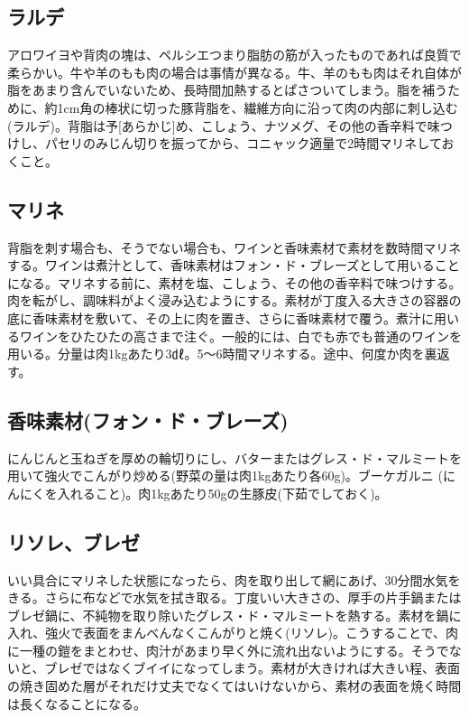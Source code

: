 \hypertarget{ux30e9ux30ebux30c7}{%
\subsection{ラルデ}\label{ux30e9ux30ebux30c7}}

アロワイヨや背肉の塊は、ペルシエつまり脂肪の筋が入ったものであれば良質で柔らかい。牛や羊のもも肉の場合は事情が異なる。牛、羊のもも肉はそれ自体が脂をあまり含んでいないため、長時間加熱するとぱさついてしまう。脂を補うために、約1cm角の棒状に切った豚背脂を、繊維方向に沿って肉の内部に刺し込む(ラルデ)。背脂は予{[}あらかじ{]}め、こしょう、ナツメグ、その他の香辛料で味つけし、パセリのみじん切りを振ってから、コニャック適量で2時間マリネしておくこと。

\hypertarget{ux30deux30eaux30cd}{%
\subsection{マリネ}\label{ux30deux30eaux30cd}}

背脂を刺す場合も、そうでない場合も、ワインと香味素材で素材を数時間マリネする。ワインは煮汁として、香味素材はフォン・ド・ブレーズとして用いることになる。マリネする前に、素材を塩、こしょう、その他の香辛料で味つけする。肉を転がし、調味料がよく浸み込むようにする。素材が丁度入る大きさの容器の底に香味素材を敷いて、その上に肉を置き、さらに香味素材で覆う。煮汁に用いるワインをひたひたの高さまで注ぐ。一般的には、白でも赤でも普通のワインを用いる。分量は肉1kgあたり3㎗。5〜6時間マリネする。途中、何度か肉を裏返す。

\hypertarget{ux9999ux5473ux7d20ux6750ux30d5ux30a9ux30f3ux30c9ux30d6ux30ecux30fcux30ba}{%
\subsection{香味素材(フォン・ド・ブレーズ)}\label{ux9999ux5473ux7d20ux6750ux30d5ux30a9ux30f3ux30c9ux30d6ux30ecux30fcux30ba}}

にんじんと玉ねぎを厚めの輪切りにし、バターまたはグレス・ド・マルミートを用いて強火でこんがり炒める(野菜の量は肉1kgあたり各60g)。ブーケガルニ
(にんにくを入れること)。肉1kgあたり50gの生豚皮(下茹でしておく)。

\hypertarget{ux30eaux30bdux30ecux30d6ux30ecux30bc}{%
\subsection{リソレ、ブレゼ}\label{ux30eaux30bdux30ecux30d6ux30ecux30bc}}

いい具合にマリネした状態になったら、肉を取り出して網にあげ、30分間水気をきる。さらに布などで水気を拭き取る。丁度いい大きさの、厚手の片手鍋またはブレゼ鍋に、不純物を取り除いたグレス・ド・マルミートを熱する。素材を鍋に入れ、強火で表面をまんべんなくこんがりと焼く(リソレ)。こうすることで、肉に一種の鎧をまとわせ、肉汁があまり早く外に流れ出ないようにする。そうでないと、ブレゼではなくブイイになってしまう。素材が大きければ大きい程、表面の焼き固めた層がそれだけ丈夫でなくてはいけないから、素材の表面を焼く時間は長くなることになる。

